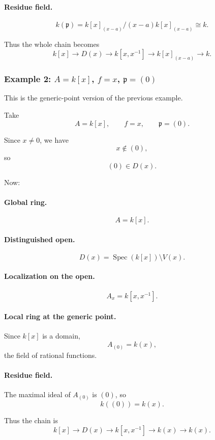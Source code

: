 \documentclass[12pt,a4paper]{article}
\theoremstyle{notespace}
\newcommand{\Spec}{\operatorname{Spec}}
\newcommand{\mf}{\mathfrak}
\theoremstyle{definition}
\begin{document}
\paragraph{Residue field.}
\[
k(\mf p)=k[x]_{(x-a)}/(x-a)k[x]_{(x-a)}\cong k.
\]

Thus the whole chain becomes
\[
k[x]
\longrightarrow
D(x)
\longrightarrow
k[x,x^{-1}]
\longrightarrow
k[x]_{(x-a)}
\longrightarrow
k.
\]

\subsubsection{Example 2: \(A=k[x]\), \(f=x\), \(\mf p=(0)\)}

This is the generic-point version of the previous example.

Take
\[
A=k[x],
\qquad
f=x,
\qquad
\mf p=(0).
\]

Since \(x\neq 0\), we have
\[
x\notin (0),
\]
so
\[
(0)\in D(x).
\]

Now:

\paragraph{Global ring.}
\[
A=k[x].
\]

\paragraph{Distinguished open.}
\[
D(x)=\Spec(k[x])\setminus V(x).
\]

\paragraph{Localization on the open.}
\[
A_x=k[x,x^{-1}].
\]

\paragraph{Local ring at the generic point.}
Since \(k[x]\) is a domain,
\[
A_{(0)}=k(x),
\]
the field of rational functions.

\paragraph{Residue field.}
The maximal ideal of \(A_{(0)}\) is \((0)\), so
\[
k((0))=k(x).
\]

Thus the chain is
\[
k[x]
\longrightarrow
D(x)
\longrightarrow
k[x,x^{-1}]
\longrightarrow
k(x)
\longrightarrow
k(x).
\]
\end{document}
